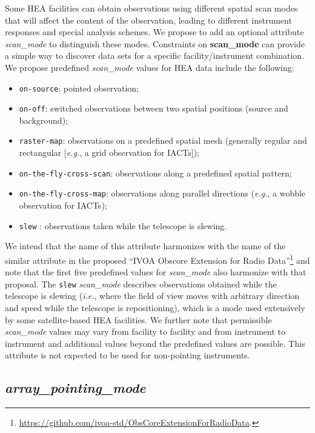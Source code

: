 \documentclass[11pt,a4paper]{ivoa}
\begin{document}
Some \gls{HEA} facilities can obtain observations using different spatial scan modes that will affect the content of the observation, leading to different instrument responses and special analysis schemes.  We propose to add an optional attribute {\em scan\_mode\/} to distinguish these modes.  Constraints on {\bf scan\_mode} can provide a simple way to discover data sets for a specific facility/instrument combination.  We propose predefined {\em scan\_mode\/} values for \gls{HEA} data include the following:
\begin{itemize}
	\item \texttt{on-source}: pointed observation;
	\item \texttt{on-off}: switched observations between two spatial positions (source and background);
	\item \texttt{raster-map}: observations on a predefined spatial mesh (generally regular and rectangular [{\em e.g.\/}, a grid observation for \glspl{IACT}]);
	\item \texttt{on-the-fly-cross-scan}: observations along a predefined spatial pattern;
	\item \texttt{on-the-fly-cross-map}: observations along parallel directions ({\em e.g.\/}, a wobble observation for \glspl{IACT});
	\item \texttt{slew} : observations taken while the telescope is slewing.
\end{itemize}
We intend that the name of this attribute harmonizes with the name of the similar attribute in the proposed ``IVOA Obscore Extension for Radio Data''\footnote{\url{https://github.com/ivoa-std/ObsCoreExtensionForRadioData}.} and note that the first five predefined values for {\em scan\_mode\/} also harmonize with that proposal.  The \texttt{slew} {\em scan\_mode\/} describes observations obtained while the telescope is slewing ({\em i.e.\/}, where the field of view moves with arbitrary direction and speed while the telescope is repositioning), which is a mode used extensively by some satellite-based \gls{HEA} facilities. We further note that permissible {\em scan\_mode\/} values may vary from facility to facility and from instrument to instrument and additional values beyond the predefined values are possible. This attribute is not expected to be used for non-pointing instruments.


\subsection{{\em array\_pointing\_mode}}
\end{document}
